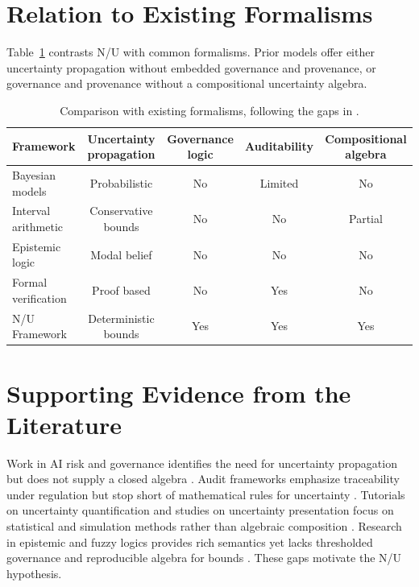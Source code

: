 \documentclass[11pt]{article}
\begin{document}
\section{Relation to Existing Formalisms}
Table~\ref{tab:comparison} contrasts N/U with common formalisms. Prior models offer either uncertainty propagation without embedded governance and provenance, or governance and provenance without a compositional uncertainty algebra.
\begin{table}[h]
\centering
\begin{tabular}{lcccc}
\toprule
Framework & Uncertainty propagation & Governance logic & Auditability & Compositional algebra \\\midrule
Bayesian models & Probabilistic & No & Limited & No \\
Interval arithmetic & Conservative bounds & No & No & Partial \\
Epistemic logic & Modal belief & No & No & No \\
Formal verification & Proof based & No & Yes & No \\
N/U Framework & Deterministic bounds & Yes & Yes & Yes \\
\bottomrule
\end{tabular}
\caption{Comparison with existing formalisms, following the gaps in \cite{Ruspini2004,VanEijck2023}.}
\label{tab:comparison}
\end{table}

\section{Supporting Evidence from the Literature}
Work in AI risk and governance identifies the need for uncertainty propagation but does not supply a closed algebra \cite{Mezzi2024,Zhao2025}. Audit frameworks emphasize traceability under regulation but stop short of mathematical rules for uncertainty \cite{IIA2024,IBM2025}. Tutorials on uncertainty quantification and studies on uncertainty presentation focus on statistical and simulation methods rather than algebraic composition \cite{NASA2023,Padilla2022}. Research in epistemic and fuzzy logics provides rich semantics yet lacks thresholded governance and reproducible algebra for bounds \cite{Ruspini2004,VanEijck2023,Yan2025,Alali2025}. These gaps motivate the N/U hypothesis.
\end{document}
